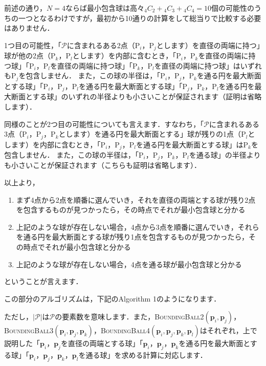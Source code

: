 ﻿\documentclass[a4paper]{jsarticle}
\begin{document}
前述の通り，$N=4$ならば最小包含球は高々${}_{4}C_{2}+{}_{4}C_{3}+{}_{4}C_{4}=10$個の可能性のうちの一つとなるわけですが，最初から10通りの計算をして総当りで比較する必要はありません．

1つ目の可能性，「$\mathcal{P}$に含まれるある2点（$\mathrm{P}_{i}$，$\mathrm{P}_{j}$とします）を直径の両端に持つ」球が他の2点（$\mathrm{P}_{k}$，$\mathrm{P}_{l}$とします）を内部に含むとき，「$\mathrm{P}_{i}$，$\mathrm{P}_{k}$を直径の両端に持つ球」「$\mathrm{P}_{i}$，$\mathrm{P}_{l}$を直径の両端に持つ球」「$\mathrm{P}_{k}$，$\mathrm{P}_{l}$を直径の両端に持つ球」はいずれも$\mathrm{P}_{j}$を包含しません．
また，この球の半径は，「$\mathrm{P}_{i}$，$\mathrm{P}_{j}$，$\mathrm{P}_{k}$を通る円を最大断面とする球」「$\mathrm{P}_{i}$，$\mathrm{P}_{j}$，$\mathrm{P}_{l}$を通る円を最大断面とする球」「$\mathrm{P}_{j}$，$\mathrm{P}_{k}$，$\mathrm{P}_{l}$を通る円を最大断面とする球」のいずれの半径よりも小さいことが保証されます（証明は省略します）．

同様のことが2つ目の可能性についても言えます．すなわち，「$\mathcal{P}$に含まれるある3点（$\mathrm{P}_{i}$，$\mathrm{P}_{j}$，$\mathrm{P}_{k}$とします）を通る円を最大断面とする」球が残りの1点（$\mathrm{P}_{l}$とします）を内部に含むとき，「$\mathrm{P}_{i}$，$\mathrm{P}_{j}$，$\mathrm{P}_{l}$を通る円を最大断面とする球」は$\mathrm{P}_{k}$を包含しません．
また，この球の半径は，「$\mathrm{P}_{i}$，$\mathrm{P}_{j}$，$\mathrm{P}_{k}$，$\mathrm{P}_{l}$を通る球」の半径よりも小さいことが保証されます（こちらも証明は省略します）．

以上より，
\begin{enumerate}
\item{まず4点から2点を順番に選んでいき，それを直径の両端とする球が残り2点を包含するものが見つかったら，その時点でそれが最小包含球と分かる}
\item{上記のような球が存在しない場合，4点から3点を順番に選んでいき，それらを通る円を最大断面とする球が残り1点を包含するものが見つかったら，その時点でそれが最小包含球と分かる}
\item{上記のような球が存在しない場合，4点を通る球が最小包含球と分かる}
\end{enumerate}
ということが言えます．

この部分のアルゴリズムは，下記のAlgorithm 1のようになります．




ただし，$|\mathcal{P}|$は$\mathcal{P}$の要素数を意味します．また，\textsc{BoundingBall2}$(\boldsymbol{p}_{i},\boldsymbol{p}_{j})$，\textsc{BoundingBall3}$(\boldsymbol{p}_{i},\boldsymbol{p}_{j},\boldsymbol{p}_{k})$，\textsc{BoundingBall4}$(\boldsymbol{p}_{i},\boldsymbol{p}_{j},\boldsymbol{p}_{k},\boldsymbol{p}_{l})$はそれぞれ，上で説明した「$\boldsymbol{p}_{i}$，$\boldsymbol{p}_{j}$を直径の両端とする球」「$\boldsymbol{p}_{i}$，$\boldsymbol{p}_{j}$，$\boldsymbol{p}_{k}$を通る円を最大断面とする球」「$\boldsymbol{p}_{i}$，$\boldsymbol{p}_{j}$，$\boldsymbol{p}_{k}$，$\boldsymbol{p}_{l}$を通る球」を求める計算に対応します．
\end{document}
